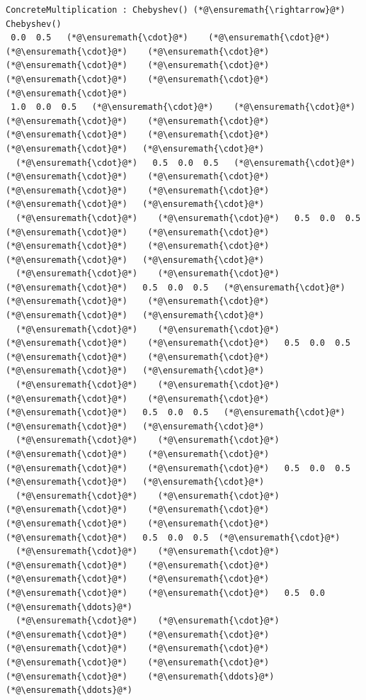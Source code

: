 \documentclass[12pt,a4paper]{article}
\begin{document}
\begin{lstlisting}
ConcreteMultiplication : Chebyshev() (*@\ensuremath{\rightarrow}@*) Chebyshev()
 0.0  0.5   (*@\ensuremath{\cdot}@*)    (*@\ensuremath{\cdot}@*)    (*@\ensuremath{\cdot}@*)    (*@\ensuremath{\cdot}@*)    (*@\ensuremath{\cdot}@*)    (*@\ensuremath{\cdot}@*)    (*@\ensuremath{\cdot}@*)    (*@\ensuremath{\cdot}@*)   (*@\ensuremath{\cdot}@*)
 1.0  0.0  0.5   (*@\ensuremath{\cdot}@*)    (*@\ensuremath{\cdot}@*)    (*@\ensuremath{\cdot}@*)    (*@\ensuremath{\cdot}@*)    (*@\ensuremath{\cdot}@*)    (*@\ensuremath{\cdot}@*)    (*@\ensuremath{\cdot}@*)   (*@\ensuremath{\cdot}@*)
  (*@\ensuremath{\cdot}@*)   0.5  0.0  0.5   (*@\ensuremath{\cdot}@*)    (*@\ensuremath{\cdot}@*)    (*@\ensuremath{\cdot}@*)    (*@\ensuremath{\cdot}@*)    (*@\ensuremath{\cdot}@*)    (*@\ensuremath{\cdot}@*)   (*@\ensuremath{\cdot}@*)
  (*@\ensuremath{\cdot}@*)    (*@\ensuremath{\cdot}@*)   0.5  0.0  0.5   (*@\ensuremath{\cdot}@*)    (*@\ensuremath{\cdot}@*)    (*@\ensuremath{\cdot}@*)    (*@\ensuremath{\cdot}@*)    (*@\ensuremath{\cdot}@*)   (*@\ensuremath{\cdot}@*)
  (*@\ensuremath{\cdot}@*)    (*@\ensuremath{\cdot}@*)    (*@\ensuremath{\cdot}@*)   0.5  0.0  0.5   (*@\ensuremath{\cdot}@*)    (*@\ensuremath{\cdot}@*)    (*@\ensuremath{\cdot}@*)    (*@\ensuremath{\cdot}@*)   (*@\ensuremath{\cdot}@*)
  (*@\ensuremath{\cdot}@*)    (*@\ensuremath{\cdot}@*)    (*@\ensuremath{\cdot}@*)    (*@\ensuremath{\cdot}@*)   0.5  0.0  0.5   (*@\ensuremath{\cdot}@*)    (*@\ensuremath{\cdot}@*)    (*@\ensuremath{\cdot}@*)   (*@\ensuremath{\cdot}@*)
  (*@\ensuremath{\cdot}@*)    (*@\ensuremath{\cdot}@*)    (*@\ensuremath{\cdot}@*)    (*@\ensuremath{\cdot}@*)    (*@\ensuremath{\cdot}@*)   0.5  0.0  0.5   (*@\ensuremath{\cdot}@*)    (*@\ensuremath{\cdot}@*)   (*@\ensuremath{\cdot}@*)
  (*@\ensuremath{\cdot}@*)    (*@\ensuremath{\cdot}@*)    (*@\ensuremath{\cdot}@*)    (*@\ensuremath{\cdot}@*)    (*@\ensuremath{\cdot}@*)    (*@\ensuremath{\cdot}@*)   0.5  0.0  0.5   (*@\ensuremath{\cdot}@*)   (*@\ensuremath{\cdot}@*)
  (*@\ensuremath{\cdot}@*)    (*@\ensuremath{\cdot}@*)    (*@\ensuremath{\cdot}@*)    (*@\ensuremath{\cdot}@*)    (*@\ensuremath{\cdot}@*)    (*@\ensuremath{\cdot}@*)    (*@\ensuremath{\cdot}@*)   0.5  0.0  0.5  (*@\ensuremath{\cdot}@*)
  (*@\ensuremath{\cdot}@*)    (*@\ensuremath{\cdot}@*)    (*@\ensuremath{\cdot}@*)    (*@\ensuremath{\cdot}@*)    (*@\ensuremath{\cdot}@*)    (*@\ensuremath{\cdot}@*)    (*@\ensuremath{\cdot}@*)    (*@\ensuremath{\cdot}@*)   0.5  0.0  (*@\ensuremath{\ddots}@*)
  (*@\ensuremath{\cdot}@*)    (*@\ensuremath{\cdot}@*)    (*@\ensuremath{\cdot}@*)    (*@\ensuremath{\cdot}@*)    (*@\ensuremath{\cdot}@*)    (*@\ensuremath{\cdot}@*)    (*@\ensuremath{\cdot}@*)    (*@\ensuremath{\cdot}@*)    (*@\ensuremath{\cdot}@*)    (*@\ensuremath{\ddots}@*)   (*@\ensuremath{\ddots}@*)
\end{lstlisting}
\end{document}
